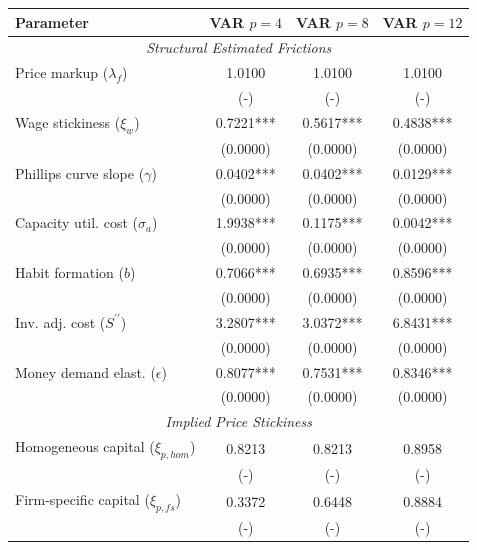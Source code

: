 \begin{table}[htpb]
    \centering
    \scriptsize
    \begin{tabular}{lccc}
    \toprule
    \textbf{Parameter} & \textbf{VAR $p=4$} & \textbf{VAR $p=8$} & \textbf{VAR $p=12$} \\
    \midrule \multicolumn{4}{c}{\textit{Structural Estimated Frictions}} \\
    Price markup ($\lambda_f$) & 1.0100 & 1.0100 & 1.0100 \\
    & (-) & (-) & (-) \\
    Wage stickiness ($\xi_w$) & 0.7221*** & 0.5617*** & 0.4838*** \\
    & (0.0000) & (0.0000) & (0.0000) \\
    Phillips curve slope ($\gamma$) & 0.0402*** & 0.0402*** & 0.0129*** \\
    & (0.0000) & (0.0000) & (0.0000) \\
    Capacity util. cost ($\sigma_a$) & 1.9938*** & 0.1175*** & 0.0042*** \\
    & (0.0000) & (0.0000) & (0.0000) \\
    Habit formation ($b$) & 0.7066*** & 0.6935*** & 0.8596*** \\
    & (0.0000) & (0.0000) & (0.0000) \\
    Inv. adj. cost ($S^{\prime\prime}$) & 3.2807*** & 3.0372*** & 6.8431*** \\
    & (0.0000) & (0.0000) & (0.0000) \\
    Money demand elast. ($\epsilon$) & 0.8077*** & 0.7531*** & 0.8346*** \\
    & (0.0000) & (0.0000) & (0.0000) \\
    \midrule \multicolumn{4}{c}{\textit{Implied Price Stickiness}} \\
    Homogeneous capital ($\xi_{p, hom}$) & 0.8213 & 0.8213 & 0.8958 \\
    & (-) & (-) & (-) \\
    Firm-specific capital ($\xi_{p, fs}$) & 0.3372 & 0.6448 & 0.8884 \\
    & (-) & (-) & (-) \\
    \bottomrule
    \end{tabular}
\end{table}

